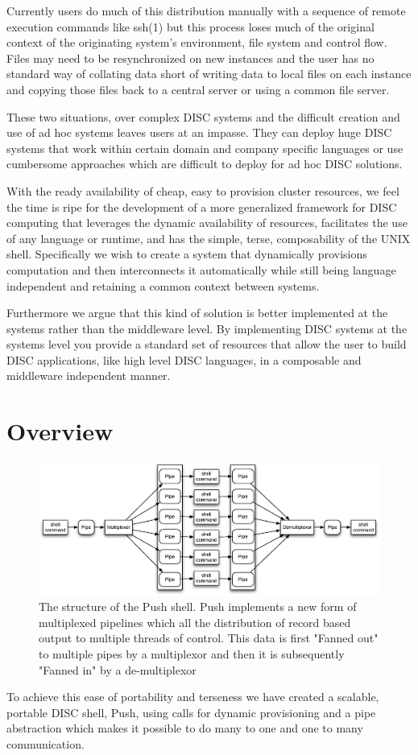 \documentclass[11pt, letterpaper]{article}
\begin{document}
Currently users do much of this distribution manually with a sequence of remote execution commands like ssh(1) but this process loses much of the original context of the originating system's environment, file system and control flow. Files may need to be resynchronized on new instances and the user has no standard way of collating data short of writing data to local files on each instance and copying those files back to a central server or using a common file server.

These two situations, over complex DISC systems and the difficult creation and use of ad hoc systems leaves users at an impasse. They can deploy huge DISC systems that work within certain domain and company specific languages or use cumbersome approaches which are difficult to deploy for ad hoc DISC solutions. 

With the ready availability of cheap, easy to provision cluster resources, we feel the time is ripe for the development of a more generalized framework for DISC computing that leverages the dynamic availability of resources, facilitates the use of any language or runtime, and has the simple, terse, composability of the UNIX shell. Specifically we wish to create a system that dynamically provisions computation and then interconnects it automatically while still being language independent and retaining a common context between systems.

Furthermore we argue that this kind of solution is better implemented at the systems rather than the middleware level. By implementing DISC systems at the systems level you provide a standard set of resources that allow the user to build DISC applications, like high level DISC languages, in a composable and middleware independent manner. 

\section{Overview}
\begin{figure}[htp]
\centering
\includegraphics[width=4.5in]{pipestruct.eps}
\caption{The structure of the Push shell. Push implements a new form of multiplexed pipelines which all the distribution of record based output to multiple threads of control. This data is first "Fanned out" to multiple pipes by a multiplexor and then it is subsequently "Fanned in" by a de-multiplexor}\label{fig:pipestruct} 
\end{figure}
To achieve this ease of portability and terseness we have created a scalable, portable DISC shell, Push, using calls for dynamic provisioning and a pipe abstraction which makes it possible to do many to one and one to many communication. 
\end{document}
